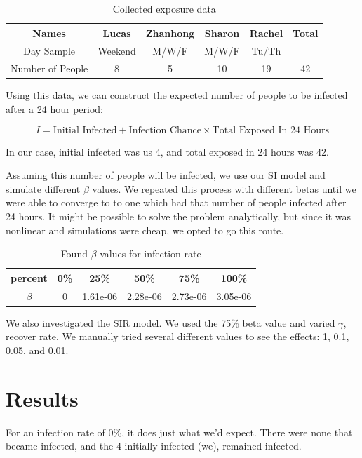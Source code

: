 \documentclass[12pt]{article}
\begin{document}
\begin{table}[H]
    \centering
    \begin{tabular}{c|c|c|c|c|c}
        Names & Lucas & Zhanhong & Sharon & Rachel & Total \\ \hline
        Day Sample &  Weekend & M/W/F & M/W/F & Tu/Th & \\ \hline
        Number of People & 8 & 5 & 10 & 19 & 42
    \end{tabular}
    \caption{Collected exposure data}
    \label{tab:peopls}
\end{table}

Using this data, we can construct the expected number of people to be infected after a 24 hour period:

\begin{equation}
    I = \text{Initial Infected} + \text{Infection Chance} \times \text{Total Exposed In 24 Hours}
\end{equation}

In our case, initial infected was us 4, and total exposed in 24 hours was 42.

Assuming this number of people will be infected, we use our SI model and simulate different $\beta$ values. We repeated this process with different betas until we were able to converge to to one which had that number of people infected after 24 hours. It might be possible to solve the problem analytically, but since it was nonlinear and simulations were cheap, we opted to go this route.


\begin{table}[H]
    \centering
    \begin{tabular}{c|ccccc}
        percent &  0\% &  25\% &  50\% &  75\% &  100\% \\ \hline
        $\beta$ & 0 & 1.61e-06 & 2.28e-06 & 2.73e-06 & 3.05e-06
    \end{tabular}
    \caption{Found $\beta$ values for infection rate}
    \label{tab:betas}
\end{table}

We also investigated the SIR model. We used the 75\% beta value and varied $\gamma$, recover rate. We manually tried several different values to see the effects: 1, 0.1, 0.05, and 0.01.

\section{Results}
For an infection rate of 0\%, it does just what we’d expect. There were none that became infected, and the 4 initially infected (we), remained infected.
\end{document}
